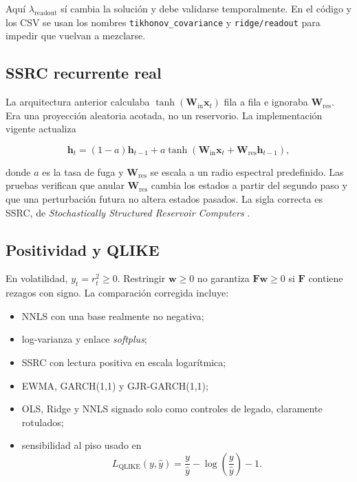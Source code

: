 \documentclass[11pt]{article}
\newcommand{\mat}[1]{\mathbf{#1}}
\newcommand{\vect}[1]{\mathbf{#1}}
\begin{document}
Aquí $\lambda_{\mathrm{readout}}$ sí cambia la solución y debe validarse temporalmente. En el
código y los CSV se usan los nombres \texttt{tikhonov\_covariance} y
\texttt{ridge/readout} para impedir que vuelvan a mezclarse.

\subsection{SSRC recurrente real}

La arquitectura anterior calculaba $\tanh(\mat W_{\mathrm{in}}\vect x_t)$ fila a fila e
ignoraba $\mat W_{\mathrm{res}}$. Era una proyección aleatoria acotada, no un reservorio. La
implementación vigente actualiza

\begin{equation}
\vect h_t=(1-a)\vect h_{t-1}+a\tanh\!\left(
\mat W_{\mathrm{in}}\vect x_t+\mat W_{\mathrm{res}}\vect h_{t-1}\right),
\label{eq:ssrc}
\end{equation}

donde $a$ es la tasa de fuga y $\mat W_{\mathrm{res}}$ se escala a un radio espectral
predefinido. Las pruebas verifican que anular $\mat W_{\mathrm{res}}$ cambia los estados a
partir del segundo paso y que una perturbación futura no altera estados pasados. La sigla
correcta es SSRC, de \emph{Stochastically Structured Reservoir Computers}
\cite{banegas2025ssrc}.

\subsection{Positividad y QLIKE}

En volatilidad, $y_t=r_t^2\geq 0$. Restringir $\vect w\geq0$ no garantiza
$\mat F\vect w\geq0$ si $\mat F$ contiene rezagos con signo. La comparación corregida incluye:

\begin{itemize}
\item NNLS con una base realmente no negativa;
\item log-varianza y enlace \emph{softplus};
\item SSRC con lectura positiva en escala logarítmica;
\item EWMA, GARCH(1,1) y GJR-GARCH(1,1);
\item OLS, Ridge y NNLS signado solo como controles de legado, claramente rotulados;
\item sensibilidad al piso usado en
\begin{equation}
L_{\mathrm{QLIKE}}(y,\hat y)=\frac{y}{\hat y}-\log\!\left(\frac{y}{\hat y}\right)-1.
\end{equation}
\end{itemize}
\end{document}
